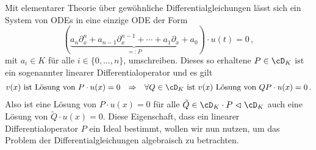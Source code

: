 Mit elementarer Theorie über gewöhnliche Differentialgleichungen lässt sich
ein System von ODEs in eine einzige ODE der Form
\begin{equation} \label{eq:UmgeformteODE}
(\underset{=:P}{\underbrace{ a_n\partial_x^n + a_{n-1}\partial_x^{n-1} +
\cdots + a_1\partial_x + a_0}})\cdot u(t)=0 \,,
\end{equation}
mit $a_i\in K$ für alle $i\in\{0,\dots,n\}$, umschreiben. Dieses so erhaltene
$P\in\cD_K$ ist ein sogenannter linearer Differentialoperator und es gilt
\begin{align*}
v(x) \text{ ist Lösung von } P\cdot u(x)=0
&&\Rightarrow && \forall Q\in \cD_K \text{ ist } v(x) \text{ Lösung von }
QP\cdot u(x)=0 \,.
\end{align*}
Also ist eine Lösung von $P\cdot u(x)=0$
für alle $\tilde Q\in\cD_K\cdot P\vartriangleleft \cD_K$
auch eine Lösung von $\tilde Q\cdot u(x)=0$.
Diese Eigenschaft, dass ein linearer Differentialoperator $P$ ein
Ideal bestimmt, wollen wir nun nutzen, um das Problem der
Differentialgleichungen algebraisch zu betrachten.

\begin{comment}
Sei $P$ ein linearer Differentialoperator mit Koeffizienten in $a_i(x)\in\Ckx$
geschrieben als $P=\sum^{d}_{i=0}{a_{i}(x)\partial_x^i}$.
Man sagt eine Funktion $u\in\cF$ ist Lösung von $P$, falls $u$ die Gleichung
$Pu=0$ erfüllt.
Man sagt $0$ ist ein singulärer Punkt falls $a_d(0)=0$.
Falls $0$ kein singulärer Punkt ist, hat $P$ genau $d$ über $\C$ Unabhängige
Lösungen in $\Ckx$.
\end{comment}


